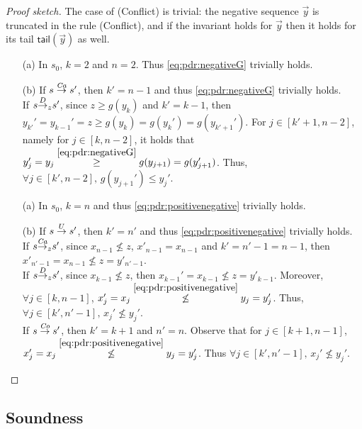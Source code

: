 \begin{proof}[Proof sketch]
	\newline
	The case of (Conflict) is trivial: the negative sequence $\vec{y}$ is truncated in the rule (Conflict), and if the invariant holds for $\vec{y}$ then it holds for its tail $\mathsf{tail}(\vec{y})$ as well.
	\begin{itemize}
		\item[(a)] In $s_0$, $k=2$ and $n=2$. Thus \eqref{eq:pdr:negativeG} trivially holds.
		\item[(b)] If $s \stackrel{\mathit{Ca}}{\to} s'$, then $k'=n-1$ and thus \eqref{eq:pdr:negativeG} trivially holds.\\
		      If $s {\stackrel{D}{\to}}_{z} s'$, since $z \ge g(y_k)$ and $k'=k-1$, then $y_{k'}' = y_{k-1}' = z \ge g(y_k) = g(y_k')= g(y_{k'+1}')$. For $j\in[k'+1,n-2]$, namely for $j\in[k,n-2]$, it holds that $y'_j= y_j\stackrel{{\eqref{eq:pdr:negativeG}}}{\ge} g(y_{j+1})=g(y_{j+1}')$. Thus, $\forall j \in [k',n-2] \text{, }g(y_{j+1}') \le y_j'$.
	\end{itemize}

	\begin{itemize}
		\item[(a)] In $s_0$, $k=n$ and thus \eqref{eq:pdr:positivenegative} trivially holds.
		\item[(b)] If $s \stackrel{U}{\to} s'$, then $k'=n'$ and thus \eqref{eq:pdr:positivenegative} trivially holds.\\
		      If $s {\stackrel{\mathit{Ca}}{\to}}_{z} s'$, since $x_{n-1} \not\le z$, $x'_{n-1}=x_{n-1}$ and $k'=n'-1=n-1$, then $x'_{n'-1} = x_{n-1}\not\le z = y'_{n'-1}$. \\
		      If $s {\stackrel{D}{\to}}_{z} s'$, since $x_{k-1} \not\le z$, then $x_{k-1}'=x_{k-1} \not\le z = y'_{k-1}$. Moreover, $\forall j \in [k, n - 1]$,
		      $x_j' = x_j \stackrel{{\eqref{eq:pdr:positivenegative}}}{ \not\le} y_j = y_j'$. Thus, $\forall j \in [k', n' - 1] \text{, } x_j' \not\le y_j'$.\\
		      If $s \stackrel{\mathit{Co}}{\to} s'$, then $k'=k+1$ and $n'=n$. Observe that for $j \in [k + 1, n - 1]$, $x'_j = x_j \stackrel{{\eqref{eq:pdr:positivenegative}}}{ \not\le} y_j =y_j'$. Thus $\forall j \in [k', n' - 1] \text{, }x_j' \not\le y_j' $.
	\end{itemize}
\end{proof}

\subsection{Soundness}

